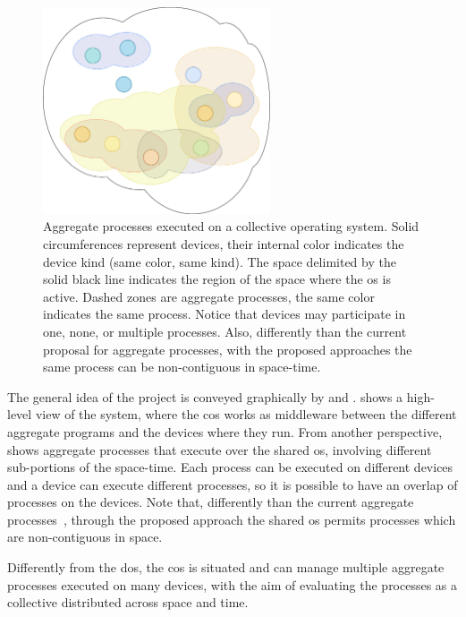 \documentclass[12pt, a4paper]{article}
\begin{document}
\begin{figure}
    \centering
    \includegraphics[width=0.6\textwidth]{figures/processes}
    \caption{
        Aggregate processes executed on a collective operating system.
        Solid circumferences represent devices, their internal color indicates the device kind
        (same color, same kind).
        The space delimited by the solid black line indicates the region of the space where the
        \ac{os} is active.
        Dashed zones are aggregate processes,
        the same color indicates the same process.
        Notice that devices may participate in one, none, or multiple processes.
        Also, differently than the current proposal for aggregate processes,
        with the proposed approaches the same process can be non-contiguous in space-time.
    }\label{fig:processes}
\end{figure}

The general idea of the project is conveyed graphically by
 and .
%
 shows a high-level view of the system,
where the \ac{cos} works as middleware between the different aggregate programs and the devices where they run.
%
From another perspective,
 shows aggregate processes that execute over the shared \ac{os},
involving different sub-portions of the space-time.
%
Each process can be executed on different devices and a device can execute different processes,
so it is possible to have an overlap of processes on the devices.
%
Note that, differently than the current aggregate processes~\cite{EAAI2020-processes},
through the proposed approach the shared \ac{os} permits processes which are non-contiguous in space.

Differently from the \ac{dos},
the \ac{cos} is situated and can manage multiple aggregate processes executed on many devices,
with the aim of evaluating the processes as a collective distributed across space and time.
\end{document}
